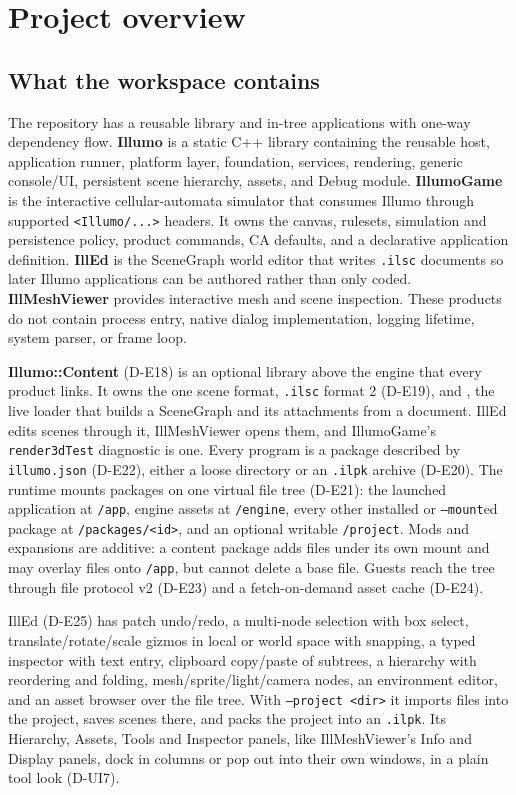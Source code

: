 \section{Project overview}
\label{sec:overview}

\subsection{What the workspace contains}
The repository has a reusable library and in-tree applications with one-way
dependency flow.
\textbf{Illumo} is a static C++ library containing the reusable host,
application runner, platform layer, foundation, services, rendering, generic
console/UI, persistent scene hierarchy, assets, and Debug module.
\textbf{IllumoGame} is the interactive cellular-automata simulator that consumes
Illumo through supported \texttt{<Illumo/...>} headers. It owns the canvas,
rulesets, simulation and persistence policy, product commands, CA defaults, and
a declarative application definition. \textbf{IllEd} is the SceneGraph world
editor that writes \texttt{.ilsc} documents so later Illumo applications can
be authored rather than only coded. \textbf{IllMeshViewer} provides interactive
mesh and scene inspection. These products do not contain process entry,
native dialog implementation, logging lifetime, system parser, or frame loop.

\textbf{Illumo::Content} (D-E18) is an optional library above the engine that
every product links. It owns the one scene format, \texttt{.ilsc} format 2
(D-E19), and , the live loader that builds a
SceneGraph and its attachments from a document. IllEd edits scenes through it,
IllMeshViewer opens them, and IllumoGame's \texttt{render3dTest} diagnostic is
one. Every program is a package described by \texttt{illumo.json} (D-E22),
either a loose directory or an \texttt{.ilpk} archive (D-E20). The runtime
mounts packages on one virtual file tree (D-E21): the launched application at
\texttt{/app}, engine assets at \texttt{/engine}, every other installed or
\texttt{--mount}ed package at \texttt{/packages/<id>}, and an optional writable
\texttt{/project}. Mods and expansions are additive: a content package adds
files under its own mount and may overlay files onto \texttt{/app}, but cannot
delete a base file. Guests reach the tree through file protocol v2 (D-E23) and
a fetch-on-demand asset cache (D-E24).

IllEd (D-E25) has patch undo/redo, a multi-node selection with box select,
translate/rotate/scale gizmos in local or world space with snapping, a typed
inspector with text entry, clipboard copy/paste of subtrees, a hierarchy with
reordering and folding, mesh/sprite/light/camera nodes, an environment editor,
and an asset browser over the file tree. With \texttt{--project <dir>} it
imports files into the project, saves scenes there, and packs the project into
an \texttt{.ilpk}. Its Hierarchy, Assets, Tools and Inspector panels, like
IllMeshViewer's Info and Display panels, dock in columns or pop out into
their own windows, in a plain tool look (D-UI7).

